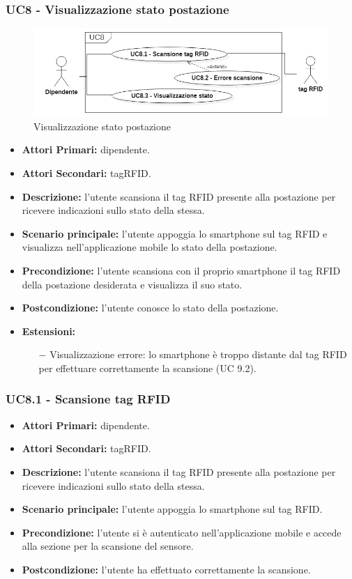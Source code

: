 \subsubsection{ UC8 - Visualizzazione stato postazione}
\begin{figure}[H]
	\centering
	\includegraphics[width=15cm]{res/images/UC8.png}
	\caption{Visualizzazione stato postazione}
	\label{fig:Visualizzazione stato postazione}
\end{figure}
\begin{itemize}
           	\item\textbf{Attori Primari:} dipendente.
           	\item\textbf{Attori Secondari:} tagRFID.
           	\item\textbf{Descrizione:} l’utente scansiona il tag RFID presente alla postazione per ricevere indicazioni sullo stato della stessa.
           	\item\textbf{Scenario principale:} l’utente appoggia lo smartphone sul tag RFID e visualizza nell'applicazione mobile lo stato della postazione.
           	\item\textbf{Precondizione:} l’utente scansiona con il proprio smartphone il tag RFID della postazione desiderata e visualizza il suo stato.
           	\item\textbf{Postcondizione:} l’utente conosce lo stato della postazione.
           	\item\textbf{Estensioni:}
           	\begin{itemize}
           		\item[$-$]  Visualizzazione errore: lo smartphone è troppo distante dal tag RFID per effettuare correttamente la scansione (UC 9.2).
           	\end{itemize}
\end{itemize}
\subsubsection{ UC8.1 - Scansione tag RFID}
\begin{itemize}
	\item\textbf{Attori Primari:} dipendente.
	\item\textbf{Attori Secondari:} tagRFID.
	\item\textbf{Descrizione:} l’utente scansiona il tag RFID presente alla postazione per ricevere indicazioni sullo stato della stessa.
	\item\textbf{Scenario principale:} l’utente appoggia lo smartphone sul tag RFID.
	\item\textbf{Precondizione:} l’utente si è autenticato nell'applicazione mobile e accede alla sezione per la scansione del sensore.
	\item\textbf{Postcondizione:} l’utente ha effettuato correttamente la scansione.
\end{itemize}
